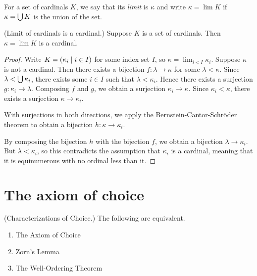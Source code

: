 \documentclass[11pt]{article}
\begin{document}
\begin{defn}
    For a set of cardinals $K$, we say that its \emph{limit} is $\kappa$ and
    write $\kappa = \lim K$ if $\kappa = \bigcup K$ is the union of the set.
\end{defn}

\begin{prop}{(Limit of cardinals is a cardinal.)}
    Suppose $K$ is a set of cardinals.
    Then $\kappa = \lim K$ is a cardinal.
\end{prop}

\begin{proof}
    Write $K = (\kappa_i \;\vert\; i \in I)$ for some index set $I$, so
    $\kappa = \lim_{i < I} \kappa_i$.
    Suppose $\kappa$ is not a cardinal.
    Then there exists a bijection $f : \lambda \to \kappa$
    for some $\lambda < \kappa$.
    Since $\lambda < \bigcup \kappa_i$,
    there exists some $i \in I$
    such that $\lambda < \kappa_i$.
    Hence there exists a surjection $g : \kappa_i \to \lambda$.
    Composing $f$ and $g$, we obtain a surjection $\kappa_i \to \kappa$.
    Since $\kappa_i < \kappa$, there exists a surjection $\kappa \to \kappa_i$.

    With surjections in both directions, we apply the
    Bernstein-Cantor-Schr\"oder theorem to obtain a bijection
    $h : \kappa \to \kappa_i$.

    By composing the bijection $h$ with the bijection $f$, we obtain a
    bijection $\lambda \to \kappa_i$.
    But $\lambda < \kappa_i$, so this contradicts the assumption that
    $\kappa_i$ is a cardinal, meaning that it is equinumerous with no ordinal
    less than it.
\end{proof}

\section{The axiom of choice}

\begin{prop}{(Characterizations of Choice.)}
    The following are equivalent.
    \begin{enumerate}
        \item
            The Axiom of Choice
        \item
            Zorn's Lemma
        \item
            The Well-Ordering Theorem
    \end{enumerate}
\end{prop}
\end{document}
